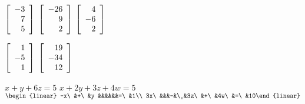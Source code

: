
\begin{enumerate}[!HW!, start=1]
\begin{multicols}{5}
\itemspade $\left[\begin{array}{r} -3\\7\\5 \end{array}\right]$
\itemspade $\left[\begin{array}{r} -26\\9\\2 \end{array}\right]$
\itemspade $\left[\begin{array}{r} 4\\-6\\2 \end{array}\right]$

\itemspade $\left[\begin{array}{r} 1\\-5\\1 \end{array}\right]$
\itemspade $\left[\begin{array}{r} 19\\ -34\\ 12 \end{array}\right]$
\end{multicols}

\begin{multicols}{3}
\itemspade $x+y+6z = 5$
\itemspade $x+2y+3z+4w=5$
\itemspade $\begin{linear} -x\ &+\ &y &&&&&&=\ &1\\ 3x\ &&&-&\ &3z\ &+\ &4w\ &=\ &10\end{linear}$
\end{multicols}


\end{enumerate}
